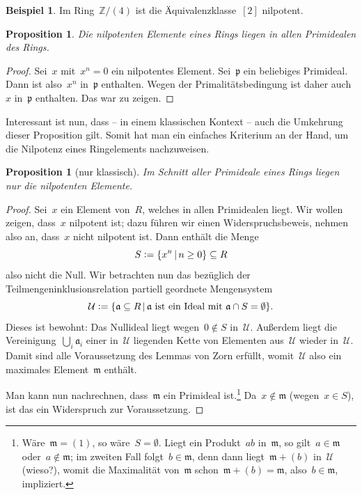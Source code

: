 \documentclass[a4paper,ngerman,12pt]{scrartcl}
\theoremstyle{definition}
\newtheorem{bsp}[defn]{Beispiel}
\theoremstyle{plain}
\newtheorem{prop}[defn]{Proposition}
\theoremstyle{remark}
\newcommand{\ZZ}{\mathbb{Z}}
\renewcommand{\aa}{\mathfrak{a}}
\newcommand{\pp}{\mathfrak{p}}
\newcommand{\mm}{\mathfrak{m}}
\newcommand{\U}{\mathcal{U}}
\renewcommand{\_}{\mathpunct{.}\,}
\newcommand{\?}{\,{:}\,}
\newcommand{\defeq}{\vcentcolon=}
\begin{document}
\begin{bsp}Im Ring~$\ZZ/(4)$ ist die Äquivalenzklasse~$[2]$ nilpotent.\end{bsp}

\begin{prop}Die nilpotenten Elemente eines Rings liegen in allen Primidealen
des Rings.\end{prop}
\begin{proof}Sei~$x$ mit~$x^n = 0$ ein nilpotentes Element. Sei~$\pp$ ein
beliebiges Primideal. Dann ist also~$x^n$ in~$\pp$ enthalten. Wegen der
Primalitätsbedingung ist daher auch~$x$ in~$\pp$ enthalten. Das war zu
zeigen.\end{proof}

Interessant ist nun, dass -- in einem klassischen Kontext -- auch die Umkehrung
dieser Proposition gilt. Somit hat man ein einfaches Kriterium an der Hand, um
die Nilpotenz eines Ringelements nachzuweisen.

\begin{prop}[nur klassisch]\label{intersectprim}%
Im Schnitt aller Primideale eines Rings liegen nur
die nilpotenten Elemente.\end{prop}
\begin{proof}Sei~$x$ ein Element von~$R$, welches in allen Primidealen liegt.
Wir wollen zeigen, dass~$x$ nilpotent ist; dazu führen wir einen
Widerspruchsbeweis, nehmen also an, dass~$x$ nicht nilpotent ist. Dann enthält
die Menge
\[ S \defeq \{ x^n \,|\, n \geq 0 \} \subseteq R \]
also nicht die Null. Wir betrachten nun das bezüglich der
Teilmengeninklusionsrelation partiell geordnete Mengensystem
\[ \U \defeq \{ \aa \subseteq R \,|\, \text{$\aa$ ist ein Ideal mit~$\aa \cap S =
\emptyset$} \}. \]
Dieses ist bewohnt: Das Nullideal liegt wegen~$0 \not\in S$ in~$\U$. Außerdem
liegt die Vereinigung~$\bigcup_i \aa_i$ einer in~$\U$ liegenden Kette von
Elementen aus~$\U$ wieder in~$\U$. Damit sind alle Voraussetzung des Lemmas von
Zorn erfüllt, womit~$\U$ also ein maximales Element~$\mm$ enthält.

Man kann nun nachrechnen, dass~$\mm$ ein Primideal ist.\footnote{Wäre~$\mm =
(1)$, so wäre~$S = \emptyset$. Liegt ein Produkt~$ab$ in~$\mm$, so gilt~$a \in
\mm$ oder~$a \not\in \mm$; im zweiten Fall folgt~$b \in \mm$, denn dann
liegt~$\mm + (b)$ in~$\U$ (wieso?), womit die Maximalität von~$\mm$
schon~$\mm + (b) = \mm$, also~$b \in \mm$, impliziert.} Da~$x \not\in \mm$
(wegen~$x \in S$), ist das ein Widerspruch zur Voraussetzung.
\end{proof}
\end{document}
